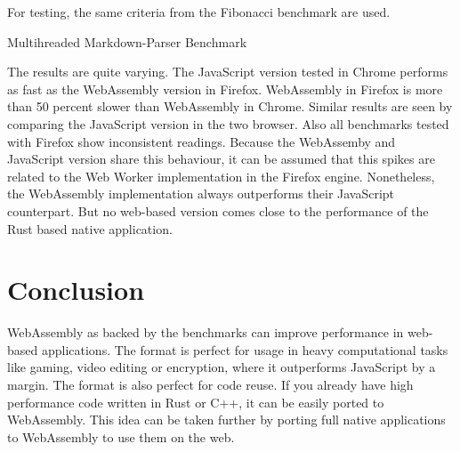 For testing, the same criteria from the Fibonacci benchmark are used. 

\begin{listing}
\begin{center}
\end{center}
\caption{Multihreaded Markdown-Parser Benchmark}
\label{lst:markdown-benchmark}
\end{listing}

The results are quite varying. The JavaScript version tested in Chrome performs as fast as the WebAssembly version in Firefox. WebAssembly in Firefox is more than 50 percent slower than WebAssembly in Chrome. Similar results are seen by comparing the JavaScript version in the two browser. Also all benchmarks tested with Firefox show inconsistent readings. Because the WebAssemby and JavaScript version share this behaviour, it can be assumed that this spikes are related to the Web Worker implementation in the Firefox engine. Nonetheless, the WebAssembly implementation always outperforms their JavaScript counterpart. But no web-based version comes close to the performance of the Rust based native application. 

\newpage

\section{Conclusion}
WebAssembly as backed by the benchmarks can improve performance in web-based applications. The format is perfect for usage in heavy computational tasks like gaming, video editing or encryption, where it  outperforms JavaScript by a margin. 
The format is also perfect for code reuse. If you already have high performance code written in Rust or C++, it can be easily ported to WebAssembly. This idea can be taken further by porting full native applications to WebAssembly to use them on the web. 

